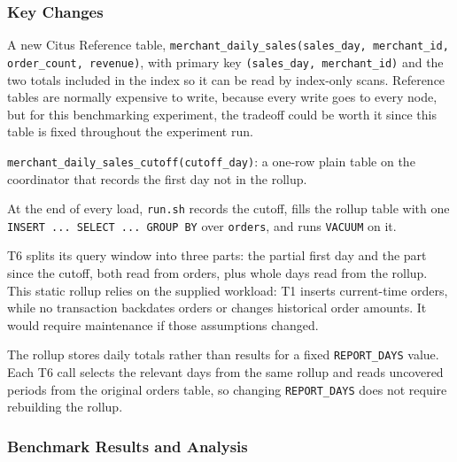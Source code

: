 \subsubsection*{Key Changes}
A new Citus Reference table, \texttt{merchant\_\allowbreak{}daily\_\allowbreak{}sales(sales\_\allowbreak{}day, merchant\_\allowbreak{}id, order\_\allowbreak{}count, revenue)}, with primary key \texttt{(sales\_\allowbreak{}day, merchant\_\allowbreak{}id)} and the two totals included in the index so it can be read by index-only scans. Reference tables are normally expensive to write, because every write goes to every node, but for this benchmarking experiment, the tradeoff could be worth it since this table is fixed throughout the experiment run.\par
\texttt{merchant\_\allowbreak{}daily\_\allowbreak{}sales\_\allowbreak{}cutoff(cutoff\_\allowbreak{}day)}: a one-row plain table on the coordinator that records the first day not in the rollup.\par
At the end of every load, \texttt{run.sh} records the cutoff, fills the rollup table with one \texttt{INSERT ... SELECT ... GROUP BY} over \texttt{orders}, and runs \texttt{VACUUM} on it.\par
T6 splits its query window into three parts: the partial first day and the part since the cutoff, both read from orders, plus whole days read from the rollup. This static rollup relies on the supplied workload: T1 inserts current-time orders, while no transaction backdates orders or changes historical order amounts. It would require maintenance if those assumptions changed.\par
The rollup stores daily totals rather than results for a fixed \texttt{REPORT\_DAYS} value. Each T6 call selects the relevant days from the same rollup and reads uncovered periods from the original orders table, so changing \texttt{REPORT\_DAYS} does not require rebuilding the rollup.\par
{}\subsubsection*{Benchmark Results and Analysis}
